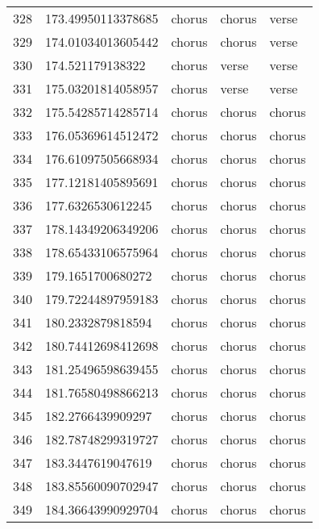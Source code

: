 \begin{table}[]
\begin{tabular}{lllll}
    328  & 173.49950113378685 & chorus       & chorus          & verse          \\
    329  & 174.01034013605442 & chorus       & chorus          & verse          \\
    330  & 174.521179138322   & chorus       & verse           & verse          \\
    331  & 175.03201814058957 & chorus       & verse           & verse          \\
    332  & 175.54285714285714 & chorus       & chorus          & chorus         \\
    333  & 176.05369614512472 & chorus       & chorus          & chorus         \\
    334  & 176.61097505668934 & chorus       & chorus          & chorus         \\
    335  & 177.12181405895691 & chorus       & chorus          & chorus         \\
    336  & 177.6326530612245  & chorus       & chorus          & chorus         \\
    337  & 178.14349206349206 & chorus       & chorus          & chorus         \\
    338  & 178.65433106575964 & chorus       & chorus          & chorus         \\
    339  & 179.1651700680272  & chorus       & chorus          & chorus         \\
    340  & 179.72244897959183 & chorus       & chorus          & chorus         \\
    341  & 180.2332879818594  & chorus       & chorus          & chorus         \\
    342  & 180.74412698412698 & chorus       & chorus          & chorus         \\
    343  & 181.25496598639455 & chorus       & chorus          & chorus         \\
    344  & 181.76580498866213 & chorus       & chorus          & chorus         \\
    345  & 182.2766439909297  & chorus       & chorus          & chorus         \\
    346  & 182.78748299319727 & chorus       & chorus          & chorus         \\
    347  & 183.3447619047619  & chorus       & chorus          & chorus         \\
    348  & 183.85560090702947 & chorus       & chorus          & chorus         \\
    349  & 184.36643990929704 & chorus       & chorus          & chorus         \\

\end{tabular}
\end{table}
